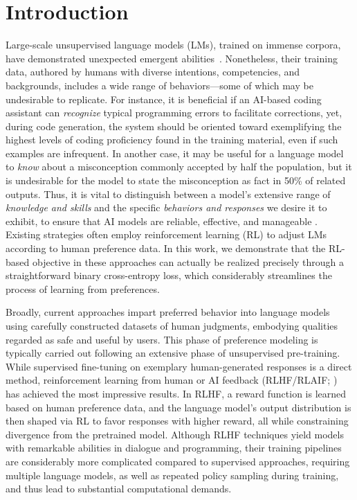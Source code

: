 \section{Introduction}
Large-scale unsupervised language models (LMs), trained on immense corpora, have demonstrated unexpected emergent abilities~\citep{chowdhery2022palm, brown2020language, touvron2023llama,bubeck2023sparks}. Nonetheless, their training data, authored by humans with diverse intentions, competencies, and backgrounds, includes a wide range of behaviors—some of which may be undesirable to replicate. For instance, it is beneficial if an AI-based coding assistant can \textit{recognize} typical programming errors to facilitate corrections, yet, during code generation, the system should be oriented toward exemplifying the highest levels of coding proficiency found in the training material, even if such examples are infrequent. In another case, it may be useful for a language model to \textit{know} about a misconception commonly accepted by half the population, but it is undesirable for the model to state the misconception as fact in 50\% of related outputs. Thus, it is vital to distinguish between a model's extensive range of \textit{knowledge and skills} and the specific \emph{behaviors and responses} we desire it to exhibit, to ensure that AI models are reliable, effective, and manageable \citep{ouyang2022training}. Existing strategies often employ reinforcement learning (RL) to adjust LMs according to human preference data. In this work, we demonstrate that the RL-based objective in these approaches can actually be realized precisely through a straightforward binary cross-entropy loss, which considerably streamlines the process of learning from preferences.

Broadly, current approaches impart preferred behavior into language models using carefully constructed datasets of human judgments, embodying qualities regarded as safe and useful by users. This phase of preference modeling is typically carried out following an extensive phase of unsupervised pre-training. While supervised fine-tuning on exemplary human-generated responses is a direct method, reinforcement learning from human or AI feedback (RLHF/RLAIF; \citep{christiano2017deep,bai2022constitutional}) has achieved the most impressive results. In RLHF, a reward function is learned based on human preference data, and the language model's output distribution is then shaped via RL to favor responses with higher reward, all while constraining divergence from the pretrained model. Although RLHF techniques yield models with remarkable abilities in dialogue and programming, their training pipelines are considerably more complicated compared to supervised approaches, requiring multiple language models, as well as repeated policy sampling during training, and thus lead to substantial computational demands.


